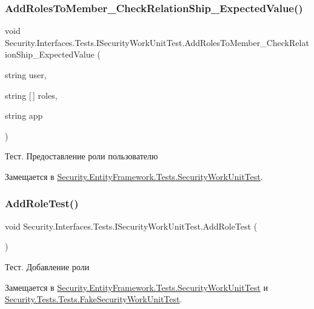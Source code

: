 \subsubsection{\texorpdfstring{Add\+Roles\+To\+Member\+\_\+\+Check\+Relation\+Ship\+\_\+\+Expected\+Value()}{AddRolesToMember\_CheckRelationShip\_ExpectedValue()}}
{\footnotesize\ttfamily void Security.\+Interfaces.\+Tests.\+I\+Security\+Work\+Unit\+Test.\+Add\+Roles\+To\+Member\+\_\+\+Check\+Relation\+Ship\+\_\+\+Expected\+Value (\begin{DoxyParamCaption}\item[{string}]{user,  }\item[{string \mbox{[}$\,$\mbox{]}}]{roles,  }\item[{string}]{app }\end{DoxyParamCaption})}



Тест. Предоставление роли пользователю 



Замещается в \hyperlink{class_security_1_1_entity_framework_1_1_tests_1_1_security_work_unit_test_ad8091cbe39ddb2ddbffaa46701960130}{Security.\+Entity\+Framework.\+Tests.\+Security\+Work\+Unit\+Test}.

\mbox{\label{interface_security_1_1_interfaces_1_1_tests_1_1_i_security_work_unit_test_a1adebc2d3ec0cb84ea2bf16dd50cb05e}} 
\subsubsection{\texorpdfstring{Add\+Role\+Test()}{AddRoleTest()}}
{\footnotesize\ttfamily void Security.\+Interfaces.\+Tests.\+I\+Security\+Work\+Unit\+Test.\+Add\+Role\+Test (\begin{DoxyParamCaption}{ }\end{DoxyParamCaption})}



Тест. Добавление роли 



Замещается в \hyperlink{class_security_1_1_entity_framework_1_1_tests_1_1_security_work_unit_test_a2e5d88021b10b11d71615bbe0eb3b294}{Security.\+Entity\+Framework.\+Tests.\+Security\+Work\+Unit\+Test} и \hyperlink{class_security_1_1_tests_1_1_tests_1_1_fake_security_work_unit_test_a51e77ba4742245022e44a66d1755810e}{Security.\+Tests.\+Tests.\+Fake\+Security\+Work\+Unit\+Test}.

